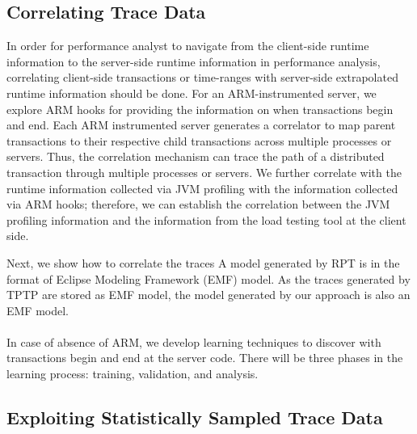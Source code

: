 \subsection{Correlating Trace Data}
\label{sec:correlating}
In order for performance analyst to navigate from the client-side runtime information to the server-side runtime information in performance analysis, correlating client-side transactions or time-ranges with server-side extrapolated runtime information should be done.
For an ARM-instrumented server, we explore ARM hooks for providing the information on when transactions begin and end. Each ARM instrumented server generates a correlator to map parent transactions to their respective child transactions across multiple processes or servers. Thus, the correlation mechanism can trace the path of a distributed transaction through multiple processes or servers. We further correlate with the runtime information collected via JVM profiling with the information collected via ARM hooks; therefore, we can establish the correlation between the JVM profiling information and the information from the load testing tool at the client side.

Next, we show how to correlate the traces 
A model generated by RPT is in the format of Eclipse Modeling Framework (EMF\cite{emf}) model. As the traces generated by TPTP are stored as EMF model, the model generated by our approach is also an EMF model.
\\
\\
In case of absence of ARM, we develop learning techniques to discover with transactions begin and end at the server code. There will be three phases in the learning process: training, validation, and analysis.

\subsection{Exploiting Statistically Sampled Trace Data}
\label{sec:statistical}


